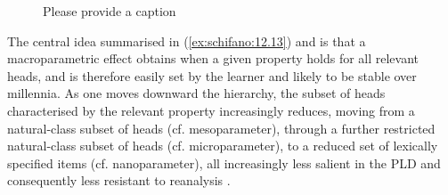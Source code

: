 \documentclass[output=paper]{langsci/langscibook}
\begin{document}
\begin{figure}
\caption{\color{red}Please provide a caption\label{ex:schifano:12.14}}
\end{figure}

The central idea summarised in (\ref{ex:schifano:12.13}) and  is that a macroparametric effect
obtains when a given property holds for all relevant heads, and is therefore
easily set by the learner and likely to be stable over millennia. As one moves
downward the hierarchy, the subset of heads characterised by the relevant
property increasingly reduces, moving from a natural-class subset of heads (cf.
mesoparameter), through a further restricted natural-class subset of heads (cf.
microparameter), to a reduced set of lexically specified items (cf.
nanoparameter), all increasingly less salient in the \gls{PLD} and consequently less
resistant to reanalysis \parencite[261]{BibRob2016}.
\end{document}
